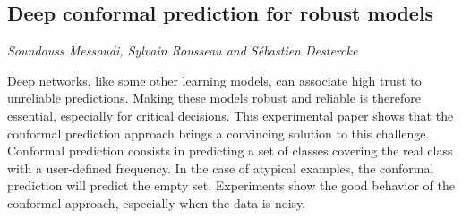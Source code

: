 \documentclass[../booklet.tex]{subfiles}
\begin{document}
\subsection[Deep conformal prediction for robust models. {\it Soundouss Messoudi, Sylvain Rousseau and Sébastien Destercke}]{Deep conformal prediction for robust models}
  

\begin{center}
  {\it Soundouss Messoudi, Sylvain Rousseau and Sébastien Destercke}
\end{center}



Deep networks, like some other learning models, can associate high trust to unreliable predictions. Making these models robust and reliable is therefore essential, especially for critical decisions. This experimental paper shows that the conformal prediction approach brings a convincing solution to this challenge. Conformal prediction consists in predicting a set of classes covering the real class with a user-defined frequency. In the case of atypical examples, the conformal prediction will predict the empty set. Experiments show the good behavior of the conformal approach, especially when the data is noisy.

\end{document}
